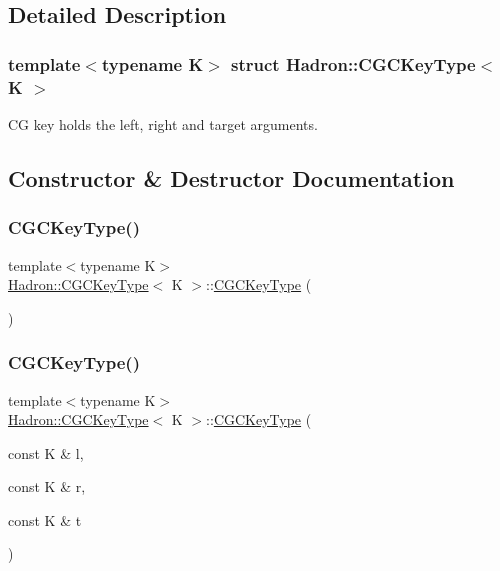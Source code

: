 \subsection{Detailed Description}
\subsubsection*{template$<$typename K$>$\newline
struct Hadron\+::\+C\+G\+C\+Key\+Type$<$ K $>$}

CG key holds the left, right and target arguments. 

\subsection{Constructor \& Destructor Documentation}
\mbox{\label{structHadron_1_1CGCKeyType_ae62b61c0cdc189bbdc1fb9c64780f03a}} 
\subsubsection{\texorpdfstring{CGCKeyType()}{CGCKeyType()}\hspace{0.1cm}{\footnotesize\ttfamily [1/6]}}
{\footnotesize\ttfamily template$<$typename K$>$ \\
\mbox{\hyperlink{structHadron_1_1CGCKeyType}{Hadron\+::\+C\+G\+C\+Key\+Type}}$<$ K $>$\+::\mbox{\hyperlink{structHadron_1_1CGCKeyType}{C\+G\+C\+Key\+Type}} (\begin{DoxyParamCaption}{ }\end{DoxyParamCaption})\hspace{0.3cm}{\ttfamily [inline]}}

\mbox{\label{structHadron_1_1CGCKeyType_a0547a9be19cf1cc084477d2eb8ee5d98}} 
\subsubsection{\texorpdfstring{CGCKeyType()}{CGCKeyType()}\hspace{0.1cm}{\footnotesize\ttfamily [2/6]}}
{\footnotesize\ttfamily template$<$typename K$>$ \\
\mbox{\hyperlink{structHadron_1_1CGCKeyType}{Hadron\+::\+C\+G\+C\+Key\+Type}}$<$ K $>$\+::\mbox{\hyperlink{structHadron_1_1CGCKeyType}{C\+G\+C\+Key\+Type}} (\begin{DoxyParamCaption}\item[{const K \&}]{l,  }\item[{const K \&}]{r,  }\item[{const K \&}]{t }\end{DoxyParamCaption})\hspace{0.3cm}{\ttfamily [inline]}}

